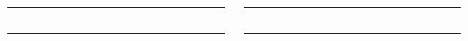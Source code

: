 \documentclass{beamer}
\begin{document}
    \begin{frame}
        \begin{columns}[onlytextwidth]
            \begin{column}{.5\textwidth}
                \rule{\textwidth}{1cm}
            \end{column}
            \begin{column}{.5\textwidth}
                \rule{\textwidth}{1cm}
            \end{column}            
        \end{columns}

        \begin{columns}
            \begin{column}{.5\textwidth}
                \rule{\textwidth}{1cm}
            \end{column}
            \begin{column}{.5\textwidth}
                \rule{\textwidth}{1cm}
            \end{column}            
        \end{columns}       

    \end{frame}
\end{document}
